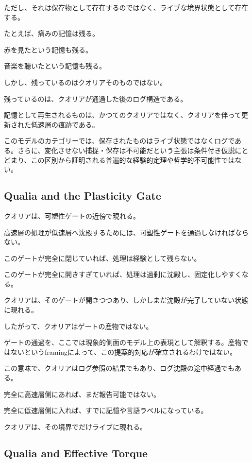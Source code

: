 ただし、それは保存物として存在するのではなく、ライブな境界状態として存在する。

たとえば、痛みの記憶は残る。

赤を見たという記憶も残る。

音楽を聴いたという記憶も残る。

しかし、残っているのはクオリアそのものではない。

残っているのは、クオリアが通過した後のログ構造である。

記憶として再生されるものは、かつてのクオリアではなく、クオリアを伴って更新された低速層の痕跡である。

このモデルのカテゴリーでは、保存されたものはライブ状態ではなくログである。さらに、変化させない捕捉・保存は不可能だという主張は条件付き仮説にとどまり、この区別から証明される普遍的な経験的定理や哲学的不可能性ではない。

\subsection{Qualia and the Plasticity Gate}

クオリアは、可塑性ゲートの近傍で現れる。

高速層の処理が低速層へ沈殿するためには、可塑性ゲートを通過しなければならない。

このゲートが完全に閉じていれば、処理は経験として残らない。

このゲートが完全に開きすぎていれば、処理は過剰に沈殿し、固定化しやすくなる。

クオリアは、そのゲートが開きつつあり、しかしまだ沈殿が完了していない状態に現れる。

したがって、クオリアはゲートの産物ではない。

ゲートの通過を、ここでは現象的側面のモデル上の表現として解釈する。産物ではないというframingによって、この提案的対応が確立されるわけではない。

この意味で、クオリアはログ参照の結果でもあり、ログ沈殿の途中経過でもある。

完全に高速層側にあれば、まだ報告可能ではない。

完全に低速層側に入れば、すでに記憶や言語ラベルになっている。

クオリアは、その境界でだけライブに現れる。

\subsection{Qualia and Effective Torque}

